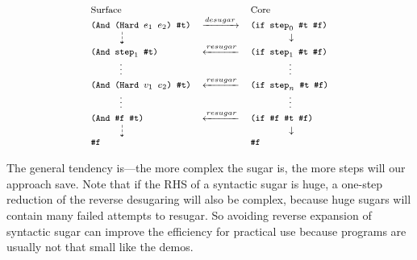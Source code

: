 \[
{\footnotesize
	\begin{array}{lcl}
	\text{Surface}&&\text{Core}\\
	\Code{(And (Hard $e_1$ $e_2$) \#t)}&\xrightarrow{desugar}&\Code{(if $\m{step}_0$ \#t \#f)}\\
	\qquad\quad\dashdownarrow& &\qquad\qquad\downarrow\\
	\Code{(And $\m{step}_1$ \#t)}&\xleftarrow{resugar}&\Code{(if $\m{step}_1$ \#t \#f)}\\
	\qquad\quad\vdots& &\qquad\qquad\vdots\\
	\Code{(And (Hard $v_1$ $e_2$) \#t)}&\xleftarrow{resugar}&\Code{(if $\m{step}_n$ \#t \#f)}\\
	\qquad\quad\vdots& &\qquad\qquad\vdots\\
	\Code{(And \#f \#t)}&\xleftarrow{resugar}& \Code{(if \#f \#t \#f)}\\
	\qquad\quad\dashdownarrow& &\qquad\qquad\downarrow\\
	\Code{\#f}&& \Code{\#f}\\
\end{array}
}
\]


The general tendency is---the more complex the sugar is, the more steps will our approach save. Note that if the RHS of a syntactic sugar is huge, a one-step reduction of the reverse desugaring will also be complex, because huge sugars will contain many failed attempts to resugar. So avoiding reverse expansion of syntactic sugar can improve the efficiency for practical use because programs are usually not that small like the demos.
